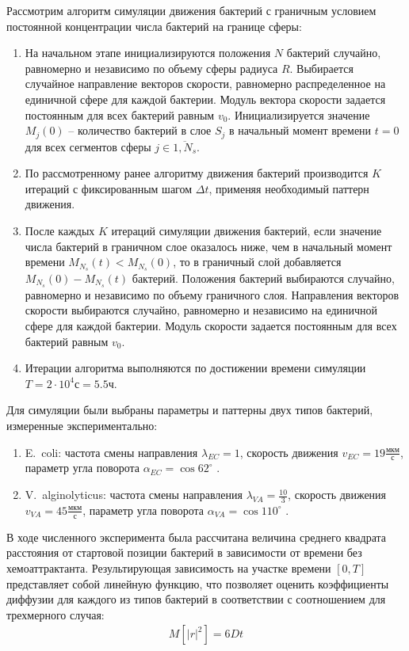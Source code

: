 Рассмотрим алгоритм симуляции движения бактерий с граничным условием постоянной концентрации числа бактерий на границе сферы:
\begin{enumerate}
    \item На начальном этапе инициализируются положения $N$ бактерий случайно, равномерно и независимо по объему сферы радиуса $R$. Выбирается случайное направление векторов скорости, равномерно распределенное на единичной сфере для каждой бактерии. Модуль вектора скорости задается постоянным для всех бактерий равным $v_0$. Инициализируется значение $M_j (0)$ -- количество бактерий в слое $S_j$ в начальный момент времени $t=0$ для всех сегментов сферы $j \in \overline{1,N_s}$.
    \item По рассмотренному ранее алгоритму движения бактерий производится $K$ итераций с фиксированным шагом $\Delta t$, применяя необходимый паттерн движения.
    \item После каждых $K$ итераций симуляции движения бактерий, если значение числа бактерий в граничном слое оказалось ниже, чем в начальный момент времени $M_{N_s}(t) < M_{N_s}(0)$, то в граничный слой добавляется $M_{N_s}(0) - M_{N_s}(t)$ бактерий. Положения бактерий выбираются случайно, равномерно и независимо по объему граничного слоя. Направления векторов скорости выбираются случайно, равномерно и независимо на единичной сфере для каждой бактерии. Модуль скорости задается постоянным для всех бактерий равным $v_0$.
    \item Итерации алгоритма выполняются по достижении времени симуляции $T = 2 \cdot 10^4 \textrm{с} = 5.5 \textrm{ч}$.
\end{enumerate}

Для симуляции были выбраны параметры и паттерны двух типов бактерий, измеренные экспериментально: 
\begin{enumerate}
    \item E.~coli: частота смены направления $\lambda_{EC}=1$, скорость движения $v_{EC}=19 \frac{\textrm{мкм}}{\textrm{с}}$, параметр угла поворота $\alpha_{EC}=\cos 62^\circ$ \cite{berg_chemotaxis_1972}.
    \item V.~alginolyticus: частота смены направления $\lambda_{VA}=\frac{10}{3}$, скорость движения $v_{VA}=45 \frac{\textrm{мкм}}{\textrm{с}}$, параметр угла поворота $\alpha_{VA}=\cos 110^\circ$ \cite{xie_bacterial_2011}.
\end{enumerate}


В ходе численного эксперимента была рассчитана величина среднего квадрата расстояния от стартовой позиции бактерий в зависимости от времени без хемоаттрактанта. Результирующая зависимость на участке времени $[0, T]$ представляет собой линейную функцию, что позволяет оценить коэффициенты диффузии для каждого из типов бактерий в соответствии с соотношением для трехмерного случая:
\begin{equation}
    \begin{aligned}
        M[|r|^2]=6Dt
    \label{eq:msd}
    \end{aligned}
\end{equation}

